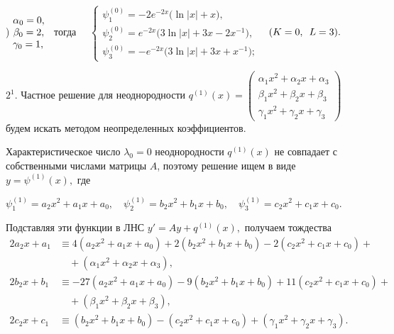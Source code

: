 \documentclass[11pt]{article}
\begin{document}
{) $\begin{matrix} \alpha_0 = 0,\hfill\\ \beta_0 = 2,\\ \gamma_0 = 1,\hfill \end{matrix}$ \ 
тогда \ \ $\begin{cases} 
\psi_1^{(0)} = -2e^{-2x} \big(\ln |x| + x\big), \\
\psi_2^{(0)} = e^{-2x} \big(3\ln |x| + 3x - 2x^{-1} \big), \\
\psi_3^{(0)} = -e^{-2x} \big(3\ln |x| + 3x + x^{-1} \big);
\end{cases}$ \
$(K=0, \hspace{0.5em} L=3).$


\smallskip
$2^1.$ Частное решение для неоднородности $q^{(1)}(x) = \begin{pmatrix} \alpha_1 x^2 + \alpha_2 x + \alpha_3 \\ \beta_1 x^2 + \beta_2 x + \beta_3 \\ \gamma_1 x^2 + \gamma_2 x + \gamma_3 \end{pmatrix}$ будем искать методом неопределенных коэффициентов. 

Характеристическое число $\lambda_0=0$ неоднородности $q^{(1)}(x)$ не совпадает с собственными числами матрицы $A$, 
поэтому решение ищем в виде $y=\psi^{(1)}(x),$ где

\smallskip
$\psi_1^{(1)} = a_2 x^2 + a_1 x + a_0, \quad \psi_2^{(1)} = b_2 x^2 + b_1 x + b_0, \quad \psi_3^{(1)} = c_2 x^2 + c_1 x + c_0.$

\smallskip
Подставляя эти функции в ЛНС $y'=Ay+q^{(1)}(x),$ получаем тождества
\begin{align*}
2a_2 x + a_1 &\equiv 4(a_2 x^2 + a_1 x + a_0) + 2(b_2 x^2 + b_1 x + b_0) - 2(c_2 x^2 + c_1 x + c_0) +\\
             &\quad + (\alpha_1 x^2 + \alpha_2 x + \alpha_3), \\
2b_2 x + b_1 &\equiv -27(a_2 x^2 + a_1 x + a_0) - 9(b_2 x^2 + b_1 x + b_0) + 11(c_2 x^2 + c_1 x + c_0) +\\
             &\quad + (\beta_1 x^2 + \beta_2 x + \beta_3), \\
2c_2 x + c_1 &\equiv (b_2 x^2 + b_1 x + b_0) - (c_2 x^2 + c_1 x + c_0) + (\gamma_1 x^2 + \gamma_2 x + \gamma_3).
\end{align*}

}
\end{document}
